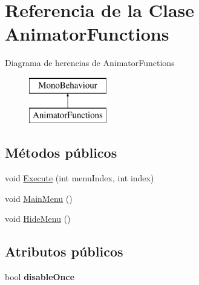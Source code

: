 \hypertarget{class_animator_functions}{}\section{Referencia de la Clase Animator\+Functions}
\label{class_animator_functions}
Diagrama de herencias de Animator\+Functions\begin{figure}[H]
\begin{center}
\leavevmode
\includegraphics[height=2.000000cm]{class_animator_functions}
\end{center}
\end{figure}
\subsection*{Métodos públicos}
\begin{DoxyCompactItemize}
\item 
void \mbox{\hyperlink{class_animator_functions_a50aa001c6ad05867751979b8e7f0abf8}{Execute}} (int menu\+Index, int index)
\item 
void \mbox{\hyperlink{class_animator_functions_a414db2e5825d7eeb07f8c1bc12b752eb}{Main\+Menu}} ()
\item 
void \mbox{\hyperlink{class_animator_functions_a70a35e4c8e707f3ac7a9797173c38065}{Hide\+Menu}} ()
\end{DoxyCompactItemize}
\subsection*{Atributos públicos}
\begin{DoxyCompactItemize}
\item 
\mbox{\label{class_animator_functions_ae073671e7de37bce6a88df30ce177150}} 
bool {\bfseries disable\+Once}
\end{DoxyCompactItemize}

